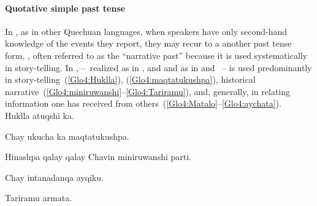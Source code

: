 \paragraph{Quotative simple past tense }\label{par:QSPT}
In \SYQ, as in other Quechuan languages, when speakers have only second-hand knowledge of the events they report, they may recur to a another past tense form, , often referred to as the “narrative past” because it is used systematically in story-telling. In \SYQ,  --~realized as  in \ACH, \AMV{} and \SP{} and as  in \CH{} and \LT~-- is used predominantly in story-telling~(\ref{Glo4:Huklla}), (\ref{Glo4:maqtatukushpa}), historical narrative~(\ref{Glo4:miniruwanshi}--\ref{Glo4:Tariramu}), and, generally, in relating information one has received from others~(\ref{Glo4:Matalo}--\ref{Glo4:aychata}).\\

%
{Huklla atuqshi ka.}%
{}%
{}{}%

%
{Chay ukucha ka maqtatukushpa.}%
{}%
{}{}%

%
{Hinashpa qalay qalay Chavin miniruwanshi parti.}%
{}%
{}{}%

%
{Chay intanadanqa ayqiku.}%
{}%
{}{}%

%
{Tariramu armata.}%
{}%
{}{}%

